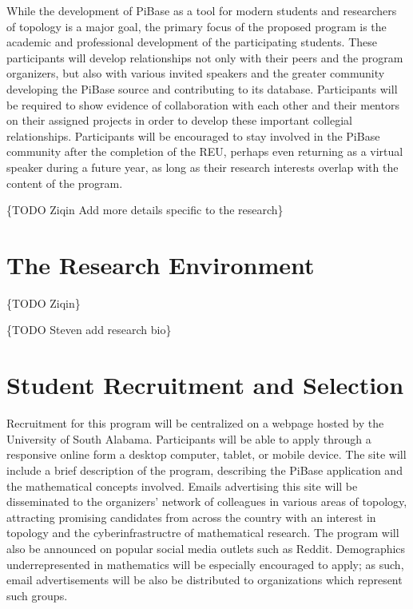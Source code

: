   While the development of PiBase as a tool for modern students and researchers
  of topology is a major goal, the primary focus of the proposed program
  is the academic and professional development of the participating students.
  These participants will develop relationships not only with their peers
  and the program organizers, but also with various invited speakers and
  the greater community developing the PiBase source and contributing to its
  database. Participants will be
  required to show evidence of collaboration with
  each other and their mentors on their assigned projects in order
  to develop these important collegial relationships. Participants will be
  encouraged to stay involved in the PiBase community after the completion
  of the REU, perhaps even returning as a virtual speaker during a future year,
  as long as their research interests overlap with the content of the program.

  \{TODO Ziqin Add more details specific to the research\}

\section{The Research Environment}

  \{TODO Ziqin\}

  \{TODO Steven add research bio\}

\section{Student Recruitment and Selection}

  Recruitment for this program will be centralized on a webpage hosted
  by the University of South Alabama. Participants will be able to apply
  through a responsive online form a desktop computer, tablet, or mobile device.
  The site will include a brief description of the program, describing the
  PiBase application and the mathematical concepts involved.
  Emails advertising this site will be disseminated to the organizers'
  network of colleagues in various areas of
  topology, attracting promising candidates from across
  the country with an interest in topology and the cyberinfrastructre of
  mathematical research. The program will also be announced on popular social
  media outlets such as Reddit. Demographics underrepresented in mathematics
  will be especially encouraged to apply; as such, email advertisements
  will be also be distributed to organizations which represent such groups.


